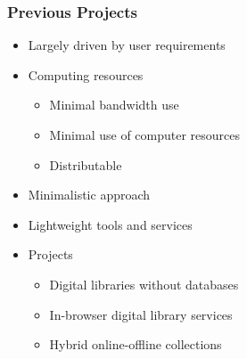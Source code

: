 \documentclass[xcolor=dvitex,t,11pt]{beamer}
\begin{document}
\begin{frame}[fragile]
\frametitle{Previous Projects}
\begin{itemize}
\item<1-> Largely driven by user requirements
\item<2-> Computing resources
\begin{itemize}
\item<3-> Minimal bandwidth use
\item<4-> Minimal use of computer resources
\item<5-> Distributable
\end{itemize}
\item<6-> Minimalistic approach
\item<7-> Lightweight tools and services
\item<8-> Projects
\begin{itemize}
\item<9-> Digital libraries without databases
\item<10-> In-browser digital library services
\item<11-> Hybrid online-offline collections
\end{itemize}
\end{itemize}
\end{frame}

\end{document}
